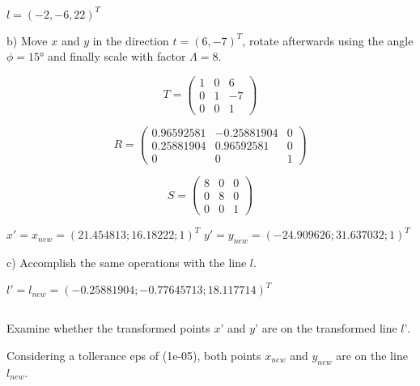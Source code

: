 \documentclass[a4paper,headings=small]{scrartcl}
\numberwithin{equation}{section} %
\numberwithin{figure}{section}   %
\begin{document}
      $l=(-2,-6, 22)^T$

b) Move $x$ and $y$ in the direction $t = (6, -7)^T$,
rotate afterwards using the angle $\phi = 15°$ and finally
scale with factor $\Lambda = 8$. \newline

\[T= \left( \begin{array}{ccc}
1 & 0 &  6 \\
0 & 1 & -7 \\
0 & 0 &  1  \end{array} \right)\] 

\[R= \left( \begin{array}{ccc}
  0.96592581 & -0.25881904 & 0 \\
  0.25881904 &  0.96592581 & 0 \\
  0          &  0          & 1  \end{array} \right)\] 

\[S= \left( \begin{array}{ccc}
8 & 0 & 0 \\
0 & 8 & 0 \\
0 & 0 & 1 \end{array} \right)\] 

$x'=x_{new}=(21.454813; 16.18222; 1)^T$ \newline
$y'=y_{new}=(-24.909626; 31.637032; 1)^T$ \newline

c) Accomplish the same operations with the line $l$. \newline

      $l'=l_{new}=(-0.25881904; -0.77645713; 18.117714)^T$




\subsection{}

Examine whether the transformed points $x’$ and $y’$ are
on the transformed line $l’$. \newline

Considering a tollerance eps of (1e-05), both points $x_{new}$ and $y_{new}$ 
are on the line $l_{new}$.
\end{document}

